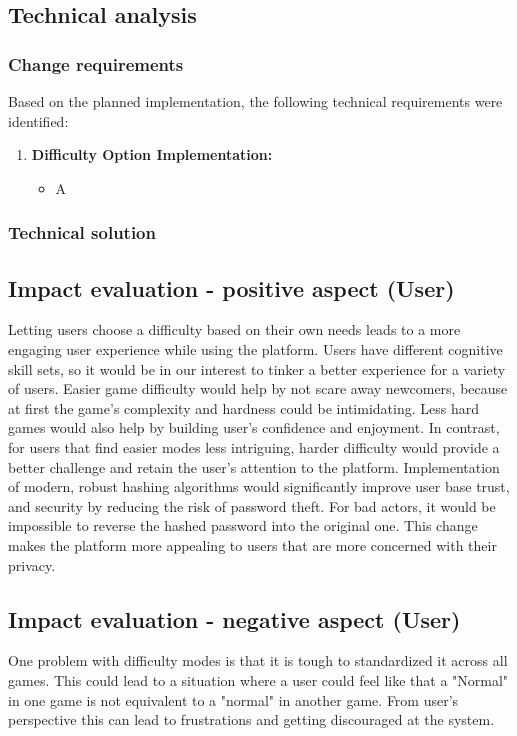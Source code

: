 \documentclass[11pt,a4paper]{article}
\begin{document}
\begin{comment}
    kaip ir done????
\end{comment}

\subsection{Technical analysis}
\subsubsection{Change requirements}
Based on the planned implementation, the following technical requirements were identified:

\begin{enumerate}
    \item  \textbf{Difficulty Option Implementation:}
    \begin{itemize}
        \item A 
    \end{itemize}
\end{enumerate}
\subsubsection{Technical solution}

\subsection{Impact evaluation - positive aspect (User)}
Letting users choose a difficulty based on their own needs leads to a more engaging user experience while using the platform. Users have different cognitive skill sets, so it would be in our interest to tinker a better experience for a variety of users. Easier game difficulty would help by not scare away newcomers, because at first the game's complexity and hardness could be intimidating. Less hard games would also help by building user's confidence and enjoyment. In contrast, for users that find easier modes less intriguing, harder difficulty would provide a better challenge and retain the user's attention to the platform.
Implementation of modern, robust hashing algorithms would significantly improve user base trust, and security by reducing the risk of password theft. For bad actors, it would be impossible to reverse the hashed password into the original one. This change makes the platform more appealing to users that are more concerned with their privacy.

\subsection{Impact evaluation - negative aspect (User)}
One problem with difficulty modes is that it is tough to standardized it across all games. This could lead to a situation where a user could feel like that a "Normal" in one game is not equivalent to a "normal" in another game. From user's perspective this can lead to frustrations and getting discouraged at the system.
\end{document}
